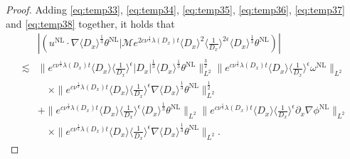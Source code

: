 \documentclass[reqno, 12pt]{amsart} %
\theoremstyle{plain} %
\theoremstyle{definition}
\theoremstyle{remark}
\numberwithin{equation}{section} %
\newcommand{\px}{\partial_x}
\begin{document}
\begin{proof}
		Adding \eqref{eq:temp33}, \eqref{eq:temp34}, \eqref{eq:temp35}, \eqref{eq:temp36}, \eqref{eq:temp37} and \eqref{eq:temp38} together, it holds that
		\begin{equation*}\begin{aligned}
				&\left|\left(  u^{\mathrm{NL}} \cdot \nabla \langle D_x \rangle^\frac13 \theta^{\mathrm{NL}} \big| \mathcal{M} e^{2 c \nu^{\frac{1}{3}} \lambda\left(D_x\right) t}\langle D_x\rangle^2\langle\frac{1}{D_x}\rangle^{2 \epsilon} \langle D_x \rangle^\frac13 \theta^{\mathrm{NL}}\right)\right| \\
				\lesssim& \|e^{c \nu^{\frac{1}{3}} \lambda\left(D_x\right) t}\langle D_x\rangle    \langle \frac{1}{D_x}\rangle^\epsilon  \left|D_x\right|^{\frac{1}{3}}\langle D_x \rangle^\frac13 \theta^{\mathrm{NL}}\|_{L^2}^\frac32 \|e^{c \nu^{\frac{1}{3}} \lambda\left(D_x\right) t}\langle D_x\rangle\langle\frac{1}{D_x}\rangle^\epsilon \omega^{\mathrm{NL}}\|_{L^2} \\
				& \quad \times\|e^{c \nu^{\frac{1}{3}} \lambda\left(D_x\right) t}\langle D_x\rangle\langle\frac{1}{D_x}\rangle^\epsilon \nabla  \langle D_x \rangle^{\frac{1}{3}} \theta^{\mathrm{NL}}\|_{L^2}^\frac12 \\
				&+ \|e^{c \nu^{\frac{1}{3}} \lambda\left(D_x\right) t}\langle D_x\rangle    \langle \frac{1}{D_x}\rangle^\epsilon  \langle D_x \rangle^{\frac{1}{3}} \theta^{\mathrm{NL}}\|_{L^2} \|e^{c \nu^{\frac{1}{3}} \lambda\left(D_x\right) t}\langle D_x\rangle\langle\frac{1}{D_x}\rangle^\epsilon \px \nabla \phi^{\mathrm{NL}}\|_{L^2} \\
				& \quad \times\|e^{c \nu^{\frac{1}{3}} \lambda\left(D_x\right) t}\langle D_x\rangle\langle\frac{1}{D_x}\rangle^\epsilon \nabla \langle D_x \rangle^{\frac{1}{3}} \theta^{\mathrm{NL}}\|_{L^2}.
		\end{aligned}\end{equation*}
		
		
		

\end{proof}
\end{document}

